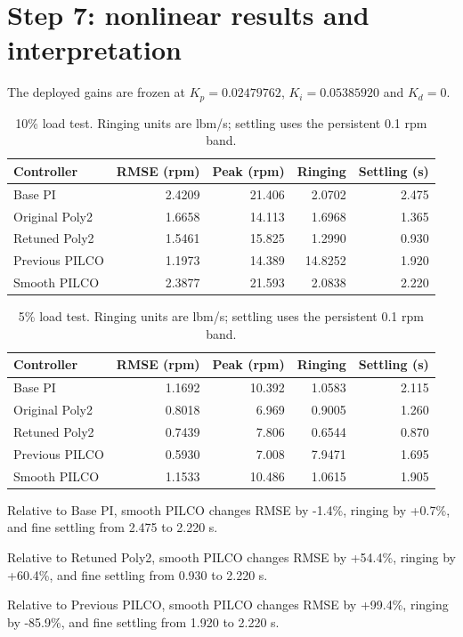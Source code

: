 \documentclass[11pt,a4paper]{article}
\begin{document}
\section{Step 7: nonlinear results and interpretation}
The deployed gains are frozen at $K_p=0.02479762$, $K_i=0.05385920$ and $K_d=0$.
\begin{table}[H]\centering\small\begin{tabular}{lrrrr}\toprule
Controller & RMSE (rpm) & Peak (rpm) & Ringing & Settling (s)\\\midrule
Base PI & 2.4209 & 21.406 & 2.0702 & 2.475\\
Original Poly2 & 1.6658 & 14.113 & 1.6968 & 1.365\\
Retuned Poly2 & 1.5461 & 15.825 & 1.2990 & 0.930\\
Previous PILCO & 1.1973 & 14.389 & 14.8252 & 1.920\\
Smooth PILCO & 2.3877 & 21.593 & 2.0838 & 2.220\\\bottomrule\end{tabular}\caption{10\% load test. Ringing units are lbm/s; settling uses the persistent 0.1 rpm band.}\end{table}
\begin{table}[H]\centering\small\begin{tabular}{lrrrr}\toprule
Controller & RMSE (rpm) & Peak (rpm) & Ringing & Settling (s)\\\midrule
Base PI & 1.1692 & 10.392 & 1.0583 & 2.115\\
Original Poly2 & 0.8018 & 6.969 & 0.9005 & 1.260\\
Retuned Poly2 & 0.7439 & 7.806 & 0.6544 & 0.870\\
Previous PILCO & 0.5930 & 7.008 & 7.9471 & 1.695\\
Smooth PILCO & 1.1533 & 10.486 & 1.0615 & 1.905\\\bottomrule\end{tabular}\caption{5\% load test. Ringing units are lbm/s; settling uses the persistent 0.1 rpm band.}\end{table}
Relative to Base PI, smooth PILCO changes RMSE by -1.4\%, ringing by +0.7\%, and fine settling from 2.475 to 2.220 s.

Relative to Retuned Poly2, smooth PILCO changes RMSE by +54.4\%, ringing by +60.4\%, and fine settling from 0.930 to 2.220 s.

Relative to Previous PILCO, smooth PILCO changes RMSE by +99.4\%, ringing by -85.9\%, and fine settling from 1.920 to 2.220 s.
\end{document}
